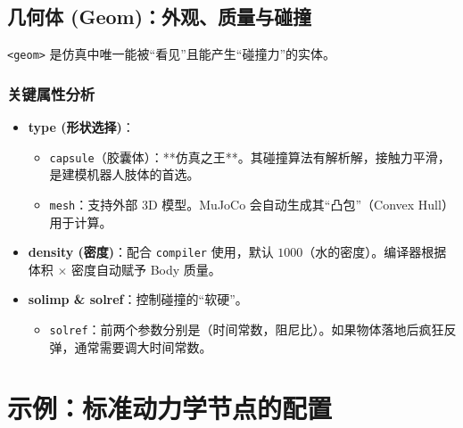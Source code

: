 \documentclass[11pt,a4paper]{book}
\begin{document}
\subsection{几何体 (Geom)：外观、质量与碰撞}
\texttt{<geom>} 是仿真中唯一能被“看见”且能产生“碰撞力”的实体。

\subsubsection{关键属性分析}
\begin{itemize}
    \item \textbf{type (形状选择)}：
    \begin{itemize}
        \item \texttt{capsule}（胶囊体）：**仿真之王**。其碰撞算法有解析解，接触力平滑，是建模机器人肢体的首选。
        \item \texttt{mesh}：支持外部 3D 模型。MuJoCo 会自动生成其“凸包”（Convex Hull）用于计算。
    \end{itemize}
    \item \textbf{density (密度)}：配合 \texttt{compiler} 使用，默认 $1000$（水的密度）。编译器根据体积 $\times$ 密度自动赋予 Body 质量。
    \item \textbf{solimp \& solref}：控制碰撞的“软硬”。
    \begin{itemize}
        \item \texttt{solref}：前两个参数分别是（时间常数，阻尼比）。如果物体落地后疯狂反弹，通常需要调大时间常数。
    \end{itemize}
\end{itemize}

\section{示例：标准动力学节点的配置}
\end{document}
